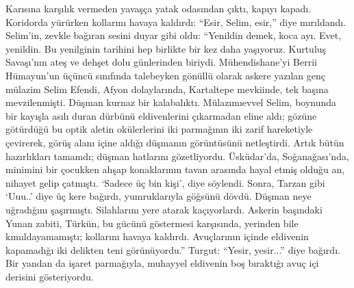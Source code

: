 \documentclass[a5paper,13pt]{scrbook}
\begin{document}
Karısına karşılık vermeden yavaşça yatak odasından çıktı, kapıyı kapadı.
Koridorda yürürken kollarını havaya kaldırdı: ``Esir, Selim, esir,'' diye
mırıldandı. Selim'in, zevkle bağıran sesini duyar gibi oldu: ``Yenildin demek,
koca ayı. Evet, yenildin. Bu yenilginin tarihini hep birlikte bir kez daha
yaşıyoruz. Kurtuluş Savaşı'nın ateş ve dehşet dolu günlerinden biriydi.
Mühendishane'yi Berrii Hümayun'un üçüncü sınıfında talebeyken gönüllü olarak
askere yazılan genç mülazim Selim Efendi, Afyon dolaylarında, Kartaltepe
mevkiinde, tek başına mevzilenmişti. Düşman kurnaz bir kalabalıktı.
Mülazımıevvel Selim, boynunda bir kayışla asılı duran dürbünü eldivenlerini
çıkarmadan eline aldı; gözüne götürdüğü bu optik aletin okülerlerini iki
parmağının iki zarif hareketiyle çevirerek, görüş alanı içine aldığı düşmanın
görüntüsünü netleştirdi. Artık bütün hazırlıkları tamamdı; düşman hatlarını
gözetliyordu. Üsküdar'da, Soğanağası'nda, minimini bir çocukken ahşap
konaklarının tavan arasında hayal etmiş olduğu an, nihayet gelip çatmıştı.
`Sadece üç bin kişi', diye söylendi. Sonra, Tarzan gibi `Uuu..' diye üç kere
bağırdı, yumruklarıyla göğsünü dövdü. Düşman neye uğradığını şaşırmıştı.
Silahlarını yere atarak kaçıyorlardı. Askerin başındaki Yunan zabiti, Türkün, bu
gücünü göstermesi karşısında, yerinden bile kımıldayamamıştı; kollarını havaya
kaldırdı. Avuçlarının içinde eldivenin kapamadığı iki delikten teni
görünüyordu.'' Turgut: ``Yesir, yesir...'' diye bağırdı. Bir yandan da işaret
parmağıyla, muhayyel eldivenin boş bıraktığı avuç içi derisini gösteriyordu.
\end{document}

